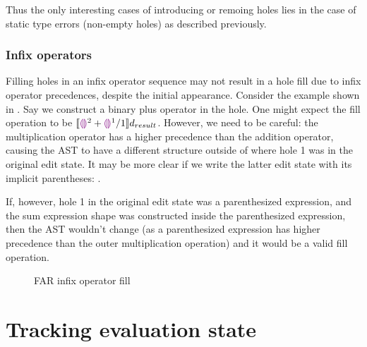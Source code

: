 Thus the only interesting cases of introducing or remoing holes lies in the case of static type errors (non-empty holes) as described previously.

\subsubsection{Infix operators}
\label{sec:far-infix-operators}

Filling holes in an infix operator sequence may not result in a hole fill due to infix operator precedences, despite the initial appearance. Consider the example shown in . Say we construct a binary plus operator in the hole. One might expect the fill operation to be $\llbracket{}\textcolor{violet}{\llparenthesis}\textcolor{violet}{\rrparenthesis}^2+\textcolor{violet}{\llparenthesis}\textcolor{violet}{\rrparenthesis}^1/1\rrbracket{}d_{result}$. However, we need to be careful: the multiplication operator has a higher precedence than the addition operator, causing the AST to have a different structure outside of where hole 1 was in the original edit state. It may be more clear if we write the latter edit state with its implicit parentheses: .

If, however, hole 1 in the original edit state was a parenthesized expression, and the sum expression shape was constructed inside the parenthesized expression, then the AST wouldn't change (as a parenthesized expression has higher precedence than the outer multiplication operation) and it would be a valid fill operation.

\begin{figure}
  \centering
  \begin{singlespace}
  \end{singlespace}
  \caption{FAR infix operator fill}
  \label{fig:far-infix-operator-fill}
\end{figure}

\section{Tracking evaluation state}
\label{sec:eval-state}

